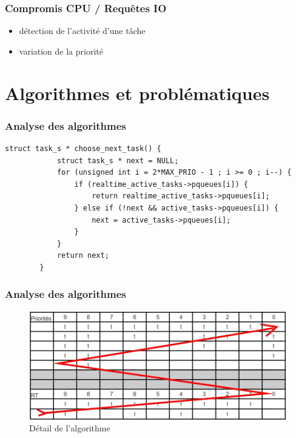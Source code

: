 \documentclass{beamer}
\begin{document}
\begin{frame}
    \frametitle{Compromis CPU / Requêtes IO}

    \begin{itemize}
        \item<2-> détection de l'activité d'une tâche
        \item<3-> variation de la priorité
    \end{itemize}

\end{frame}

\section{Algorithmes et problématiques}

\begin{frame}[fragile]
    \frametitle{Analyse des algorithmes}

    \begin{lstlisting}[caption=Choix de la prochaine tâche à exécuter]
        struct task_s * choose_next_task() {
            struct task_s * next = NULL;
            for (unsigned int i = 2*MAX_PRIO - 1 ; i >= 0 ; i--) {
                if (realtime_active_tasks->pqueues[i]) {
                    return realtime_active_tasks->pqueues[i];
                } else if (!next && active_tasks->pqueues[i]) {
                    next = active_tasks->pqueues[i];
                }
            }
            return next;
        }
    \end{lstlisting}
\end{frame}

\begin{frame}
  \frametitle{Analyse des algorithmes}
  
    \begin{figure}
      \includegraphics[scale=0.3]{ordo.jpg}
      \caption{Détail de l'algorithme}
    \end{figure}

 
\end{frame}
\end{document}

